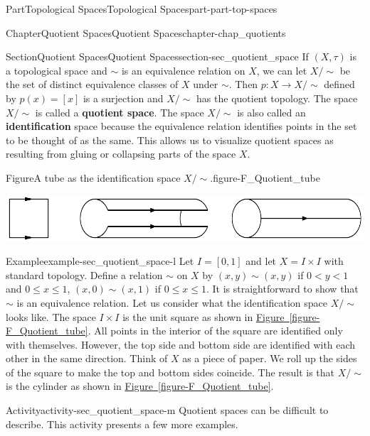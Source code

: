 \documentclass[oneside,10pt,]{book}
\newcommand{\xreffont}{\relax}
\newcommand{\terminology}[1]{\textbf{#1}}
\numberwithin{equation}{chapter}
\newcommand{\ssim}{\sim}
\newcommand{\lt}{<}
\begin{document}
\begin{partptx}{Part}{Topological Spaces}{}{Topological Spaces}{}{}{part-part-top-spaces}
\begin{chapterptx}{Chapter}{Quotient Spaces}{}{Quotient Spaces}{}{}{chapter-chap_quotients}
\begin{sectionptx}{Section}{Quotient Spaces}{}{Quotient Spaces}{}{}{section-sec_quotient_space}
 If \((X, \tau)\) is a topological space and \(\sim\) is an equivalence relation on \(X\), we can let \(X/\ssim\) be the set of distinct equivalence classes of \(X\) under \(\sim\). Then \(p: X \to X/\ssim\) defined by \(p(x) = [x]\) is a surjection and \(X/\ssim\) has the quotient topology. The space \(X/\ssim\) is called a \terminology{quotient space}. The space \(X/\ssim\) is also called an \terminology{identification} space because the equivalence relation identifies points in the set to be thought of as the same. This allows us to visualize quotient spaces as resulting from gluing or collapsing parts of the space \(X\).%
\begin{figureptx}{Figure}{A tube as the identification space \(X/\ssim\).}{figure-F_Quotient_tube}{}%
\begin{image}{0.05}{0.9}{0.05}{}%
\includegraphics[width=\linewidth]{external/Cylinder_identification.pdf}
\end{image}%
\tcblower
\end{figureptx}%
\begin{example}{Example}{}{example-sec_quotient_space-l}%
Let \(I = [0,1]\) and let \(X = I \times I\) with standard topology. Define a relation \(\sim\) on \(X\) by \((x,y) \sim (x,y)\) if \(0 \lt y \lt 1\) and \(0 \leq x \leq 1\), \((x,0) \sim (x,1)\) if \(0 \leq x \leq 1\). It is straightforward to show that \(\sim\) is an equivalence relation. Let us consider what the identification space \(X/\ssim\) looks like. The space \(I \times I\) is the unit square as shown in \hyperref[figure-F_Quotient_tube]{Figure~{\xreffont\ref{figure-F_Quotient_tube}}}. All points in the interior of the square are identified only with themselves. However, the top side and bottom side are identified with each other in the same direction. Think of \(X\) as a piece of paper. We roll up the sides of the square to make the top and bottom sides coincide. The result is that \(X/\ssim\) is the cylinder as shown in \hyperref[figure-F_Quotient_tube]{Figure~{\xreffont\ref{figure-F_Quotient_tube}}}.%
\end{example}
\begin{activity}{Activity}{}{activity-sec_quotient_space-m}%
Quotient spaces can be difficult to describe. This activity presents a few more examples.%
\begin{enumerate}[font=\bfseries,label=(\alph*),ref=\alph*]%

\end{enumerate}
\end{activity}
\end{sectionptx}
\end{chapterptx}
\end{partptx}
\end{document}
